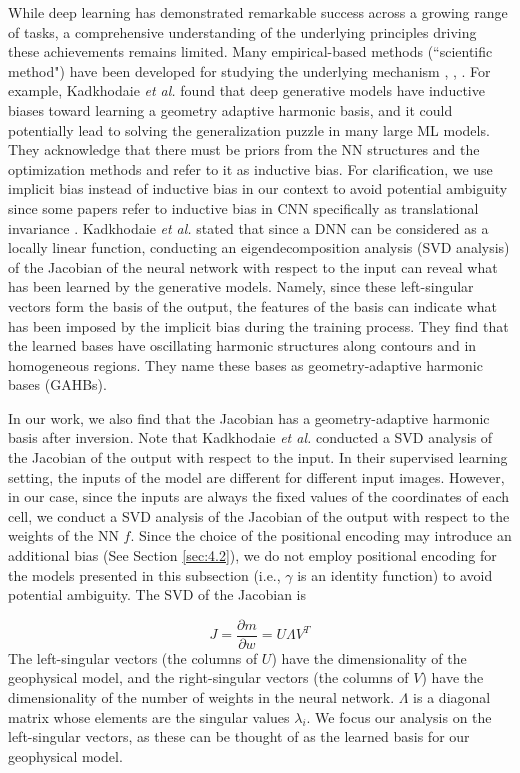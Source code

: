 \documentclass[lettersize,journal]{IEEEtran}
\begin{document}
While deep learning has demonstrated remarkable success across a growing range of tasks, a comprehensive understanding of the underlying principles driving these achievements remains limited. Many empirical-based methods (``scientific method") have been developed for studying the underlying mechanism \cite{Physics_of_LLMS}, \cite{kaplan2020scalinglawsneurallanguage}, \cite{Zahra}. For example, Kadkhodaie \textit{et al.} \cite{Zahra} found that deep generative models have inductive biases toward learning a geometry adaptive harmonic basis, and it could potentially lead to solving the generalization puzzle in many large ML models. They acknowledge that there must be priors from the NN structures and the optimization methods and refer to it as inductive bias. For clarification, we use implicit bias instead of inductive bias in our context to avoid potential ambiguity since some papers refer to inductive bias in CNN specifically as translational invariance \cite{kayhan2020translationinvariancecnnsconvolutional}. Kadkhodaie \textit{et al.} \cite{Zahra} stated that since a DNN can be considered as a locally linear function, conducting an eigendecomposition analysis (SVD analysis) of the Jacobian of the neural network with respect to the input can reveal what has been learned by the generative models. Namely, since these left-singular vectors form the basis of the output, the features of the basis can indicate what has been imposed by the implicit bias during the training process. They find that the learned bases have oscillating harmonic structures along contours and in homogeneous regions. They name these bases as geometry-adaptive harmonic bases (GAHBs). 

In our work, we also find that the Jacobian has a geometry-adaptive harmonic basis after inversion. Note that Kadkhodaie \textit{et al.} \cite{Zahra} conducted a SVD analysis of the Jacobian of the output with respect to the input. In their supervised learning setting, the inputs of the model are different for different input images. However, in our case, since the inputs are always the fixed values of the coordinates of each cell, we conduct a SVD analysis of the Jacobian of the output with respect to the weights of the NN $f$. Since the choice of the positional encoding may introduce an additional bias (See Section \ref{sec:4.2}), we do not employ positional encoding for the models presented in this subsection (i.e., $\gamma$ is an identity function) to avoid potential ambiguity. The SVD of the Jacobian is

\begin{equation}
\label{SVD of J}
J = \frac{\partial m}{\partial w} = U \Lambda V^T
\end{equation}
The left-singular vectors (the columns of $U$) have the dimensionality of the geophysical model, and the right-singular vectors (the columns of $V$) have the dimensionality of the number of weights in the neural network. $\Lambda$ is a diagonal matrix whose elements are the singular values $\lambda_i$. We focus our analysis on the left-singular vectors, as these can be thought of as the learned basis for our geophysical model. 
\end{document}
